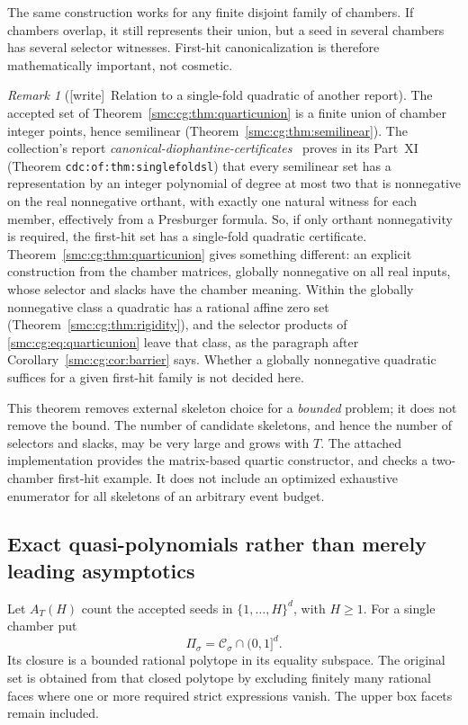 \documentclass[11pt,letterpaper]{article}
\numberwithin{equation}{section}
\theoremstyle{definition}
\theoremstyle{remark}
\newtheorem{remark}[theorem]{Remark}
\newcommand{\Ccal}{\mathcal C}
\newcommand{\wtag}{\textup{[write]}}
\begin{document}
The same construction works for any finite disjoint family of chambers. If
chambers overlap, it still represents their union, but a seed in several
chambers has several selector witnesses. First-hit canonicalization is
therefore mathematically important, not cosmetic.

\begin{remark}[\wtag\ Relation to a single-fold quadratic of another report]\label{smc:cg:rem:singlefold}
The accepted set of Theorem~\ref{smc:cg:thm:quarticunion} is a finite union of chamber integer points, hence semilinear (Theorem~\ref{smc:cg:thm:semilinear}). The collection's report \emph{canonical-diophantine-certificates}~\cite{cdc} proves in its Part~XI (Theorem \texttt{cdc:of:thm:singlefoldsl}) that every semilinear set has a representation by an integer polynomial of degree at most two that is nonnegative on the real nonnegative orthant, with exactly one natural witness for each member, effectively from a Presburger formula. So, if only orthant nonnegativity is required, the first-hit set has a single-fold quadratic certificate. Theorem~\ref{smc:cg:thm:quarticunion} gives something different: an explicit construction from the chamber matrices, globally nonnegative on all real inputs, whose selector and slacks have the chamber meaning. Within the globally nonnegative class a quadratic has a rational affine zero set (Theorem~\ref{smc:cg:thm:rigidity}), and the selector products of \eqref{smc:cg:eq:quarticunion} leave that class, as the paragraph after Corollary~\ref{smc:cg:cor:barrier} says. Whether a globally nonnegative quadratic suffices for a given first-hit family is not decided here.
\end{remark}

This theorem removes external skeleton choice for a \emph{bounded} problem;
it does not remove the bound. The number of candidate skeletons, and hence
the number of selectors and slacks, may be very large and grows with $T$.
The attached implementation provides the matrix-based quartic constructor,
and checks a two-chamber first-hit example. It does not include an optimized
exhaustive enumerator for all skeletons of an arbitrary event budget.

\subsection{Exact quasi-polynomials rather than merely leading asymptotics}

Let $A_T(H)$ count the accepted seeds in $\{1,\ldots,H\}^d$, with $H\ge1$.
For a single chamber put
\[
 \Pi_\sigma=\Ccal_\sigma\cap(0,1]^d.
\]
Its closure is a bounded rational polytope in its equality subspace.
The original set is obtained from that closed polytope by excluding finitely
many rational faces where one or more required strict expressions vanish.
The upper box facets remain included.
\end{document}
